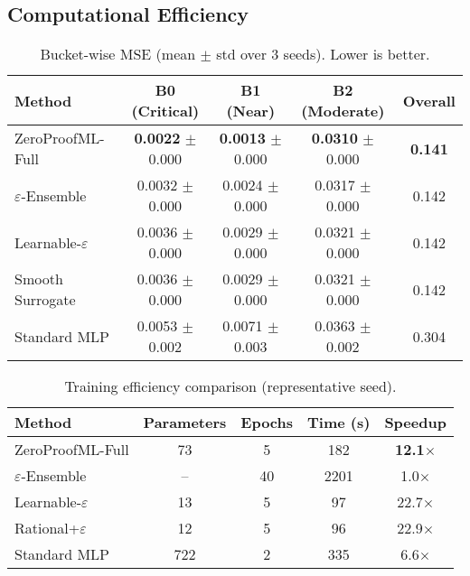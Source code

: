\documentclass[twoside,11pt]{article}
\begin{document}




\subsection{Computational Efficiency}
\begin{table}[t]
\centering
\caption{Bucket-wise MSE (mean $\pm$ std over 3 seeds). Lower is better.}
\label{tab:bucket_mse}
\begin{tabular}{lcccc}
\toprule
Method & B0 (Critical) & B1 (Near) & B2 (Moderate) & Overall \\
\midrule
ZeroProofML-Full & \textbf{0.0022} $\pm$ 0.000 & \textbf{0.0013} $\pm$ 0.000 & \textbf{0.0310} $\pm$ 0.000 & \textbf{0.141} \\
$\varepsilon$-Ensemble & 0.0032 $\pm$ 0.000 & 0.0024 $\pm$ 0.000 & 0.0317 $\pm$ 0.000 & 0.142 \\
Learnable-$\varepsilon$ & 0.0036 $\pm$ 0.000 & 0.0029 $\pm$ 0.000 & 0.0321 $\pm$ 0.000 & 0.142 \\
Smooth Surrogate & 0.0036 $\pm$ 0.000 & 0.0029 $\pm$ 0.000 & 0.0321 $\pm$ 0.000 & 0.142 \\
Standard MLP & 0.0053 $\pm$ 0.002 & 0.0071 $\pm$ 0.003 & 0.0363 $\pm$ 0.002 & 0.304 \\
\bottomrule
\end{tabular}
\end{table}

\begin{table}[t]
\centering
\caption{Training efficiency comparison (representative seed).}
\label{tab:efficiency}
\begin{tabular}{lcccc}
\toprule
Method & Parameters & Epochs & Time (s) & Speedup \\
\midrule
ZeroProofML-Full & 73 & 5 & 182 & \textbf{12.1$\times$} \\
$\varepsilon$-Ensemble & -- & 40 & 2201 & 1.0$\times$ \\
Learnable-$\varepsilon$ & 13 & 5 & 97 & 22.7$\times$ \\
Rational+$\varepsilon$ & 12 & 5 & 96 & 22.9$\times$ \\
Standard MLP & 722 & 2 & 335 & 6.6$\times$ \\
\bottomrule
\end{tabular}
\end{table}
\end{document}
